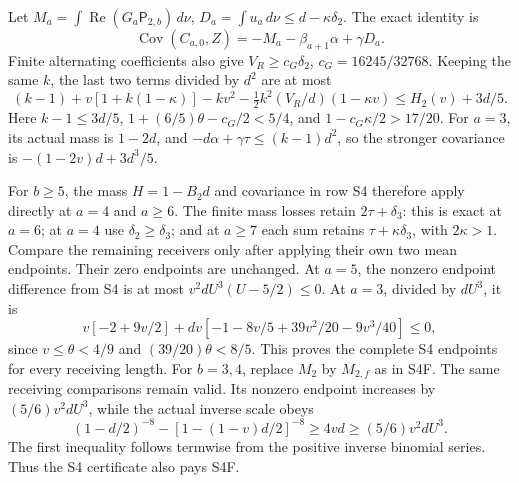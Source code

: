 Let \(M_a=\int\operatorname{Re}(G_a\mathsf P_{2,b})\,d\nu\),
\(D_a=\int u_a\,d\nu\le d-\kappa\delta_2\). The exact identity is
\[
 \operatorname{Cov}(C_{a,0},Z)=-M_a-\beta_{a+1}\alpha+\gamma D_a.
\]
Finite alternating coefficients also give
\(V_R\ge c_G\delta_2\), \(c_G=16245/32768\).
Keeping the same \(k\), the last two terms divided by \(d^2\)
are at most
\[
 (k-1)+v[1+k(1-\kappa)]-kv^2
 -\tfrac12k^2(V_R/d)(1-\kappa v)
 \le H_2(v)+3d/5.
\]
Here \(k-1\le3d/5\),
\(1+(6/5)\theta-c_G/2<5/4\), and
\(1-c_G\kappa/2>17/20\). For \(a=3\), its actual mass is
\(1-2d\), and \(-d\alpha+\gamma\tau\le(k-1)d^2\), so the
stronger covariance is \(-(1-2v)d+3d^3/5\).

For \(b\ge5\), the mass \(H=1-B_2d\) and covariance in row S4
therefore apply directly at \(a=4\) and \(a\ge6\).
The finite mass losses retain \(2\tau+\delta_3\): this is exact
at \(a=6\); at \(a=4\) use \(\delta_2\ge\delta_3\); and at
\(a\ge7\) each sum retains \(\tau+\kappa\delta_3\), with
\(2\kappa>1\). Compare the remaining receivers only after applying
their own two mean endpoints. Their zero endpoints are unchanged.
At \(a=5\), the nonzero endpoint difference from S4 is at most
\(v^2dU^3(U-5/2)\le0\). At \(a=3\), divided by \(dU^3\), it is
\[
 v[-2+9v/2]+dv[-1-8v/5+39v^2/20-9v^3/40]\le0,
\]
since \(v\le\theta<4/9\) and \((39/20)\theta<8/5\).
This proves the complete S4 endpoints for every receiving length.
For \(b=3,4\), replace \(M_2\) by \(M_{2,f}\) as in S4F.
The same receiving comparisons remain valid. Its nonzero endpoint
increases by \((5/6)v^2dU^3\), while the actual inverse scale obeys
\begin{equation}\label{eq:q117-unified:shortone-prefix-scale}
 (1-d/2)^{-8}-[1-(1-v)d/2]^{-8}
 \ge4vd\ge(5/6)v^2dU^3.
\end{equation}
The first inequality follows termwise from the positive inverse
binomial series. Thus the S4 certificate also pays S4F.

